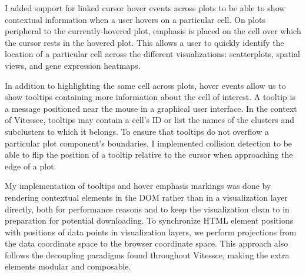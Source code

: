 \documentclass[12pt, letterpaper]{article}
\begin{document}
I added support for linked cursor hover events across plots to be able to show contextual information when a user hovers on a particular cell.
On plots peripheral to the currently-hovered plot, emphasis is placed on the cell over which the cursor rests in the hovered plot.
This allows a user to quickly identify the location of a particular cell across the different visualizations: scatterplots, spatial views, and gene expression heatmaps.

In addition to highlighting the same cell across plots, hover events allow us to show tooltips containing more information about the cell of interest.
A tooltip is a message positioned near the mouse in a graphical user interface.
In the context of Vitessce, tooltips may contain a cell's ID or list the names of the clusters and subclusters to which it belongs.
To ensure that tooltips do not overflow a particular plot component's boundaries, I implemented collision detection to be able to flip the position of a tooltip relative to the cursor when approaching the edge of a plot.

My implementation of tooltips and hover emphasis markings was done by rendering contextual elements in the DOM rather than in a visualization layer directly, both for performance reasons and to keep the visualization clean to in preparation for potential downloading.
To synchronize HTML element positions with positions of data points in visualization layers, we perform projections from the data coordinate space to the browser coordinate space.
This approach also follows the decoupling paradigms found throughout Vitessce, making the extra elements modular and composable.
\end{document}
